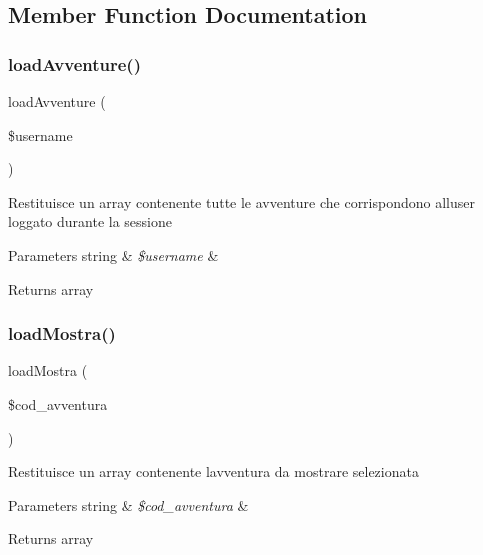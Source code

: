\subsection{Member Function Documentation}
\mbox{\label{class_f_avventura_af0d1851adb6a197e257708a29576d5a1}} 
\subsubsection{\texorpdfstring{load\+Avventure()}{loadAvventure()}}
{\footnotesize\ttfamily load\+Avventure (\begin{DoxyParamCaption}\item[{}]{\$username }\end{DoxyParamCaption})}

Restituisce un array contenente tutte le avventure che corrispondono all\textquotesingle{}user loggato durante la sessione


\begin{DoxyParams}[1]{Parameters}
string & {\em \$username} & \\
\hline
\end{DoxyParams}
\begin{DoxyReturn}{Returns}
array 
\end{DoxyReturn}
\mbox{\label{class_f_avventura_ac86f7880e6e8e228f0559680fbd165b1}} 
\subsubsection{\texorpdfstring{load\+Mostra()}{loadMostra()}}
{\footnotesize\ttfamily load\+Mostra (\begin{DoxyParamCaption}\item[{}]{\$cod\+\_\+avventura }\end{DoxyParamCaption})}

Restituisce un array contenente l\textquotesingle{}avventura da mostrare selezionata


\begin{DoxyParams}[1]{Parameters}
string & {\em \$cod\+\_\+avventura} & \\
\hline
\end{DoxyParams}
\begin{DoxyReturn}{Returns}
array 
\end{DoxyReturn}
\mbox{\label{class_f_avventura_ac2694a7dd3ef55896292c94037bad8b7}} 
